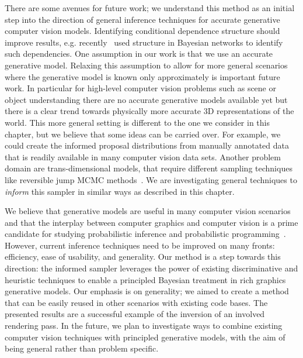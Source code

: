 There are some avenues for future work; we understand this method as
an initial step into the direction of general inference techniques for
accurate generative computer vision models. Identifying conditional
dependence structure should improve results, e.g.
recently~\cite{stuhlmueller2013nips} used structure in Bayesian
networks to identify such dependencies.
One assumption in our work is that we use an accurate generative
model. Relaxing this assumption to allow for more general scenarios
where the generative model is known only approximately is important
future work. In particular for high-level computer vision problems
such as scene or object understanding there are no accurate generative
models available yet but there is a clear trend towards physically
more accurate 3D representations of the world.
%
This more general setting is different to the one we consider in this
chapter, but we believe that some ideas can be carried over. For
example, we could create the informed proposal distributions from
manually annotated data that is readily available in many computer
vision data sets. Another problem domain are trans-dimensional models,
that require different sampling techniques like reversible jump MCMC
methods~\cite{green1995reversible,brooks2011mcmchandbook}.
We are investigating general techniques to \emph{inform} this
sampler in similar ways as described in this chapter.

We believe that generative models are useful in many computer vision
scenarios and that the interplay between computer graphics and
computer vision is a prime candidate for studying probabilistic
inference and probabilistic
programming~\cite{mansinghka2013approximate}.
%
However, current inference techniques need to be improved on many
fronts: efficiency, ease of usability, and generality. Our method is a
step towards this direction: the informed sampler leverages the power
of existing discriminative and heuristic techniques to enable a
principled Bayesian treatment in rich graphics generative models.
Our emphasis is on generality; we aimed to create a method that can be easily
reused in other scenarios with existing code bases.
%
The presented results are a successful example of the inversion of an
involved rendering pass.
%
In the future, we plan to investigate ways to combine existing computer
vision techniques with principled generative models, with the aim of
being general rather than problem specific.

